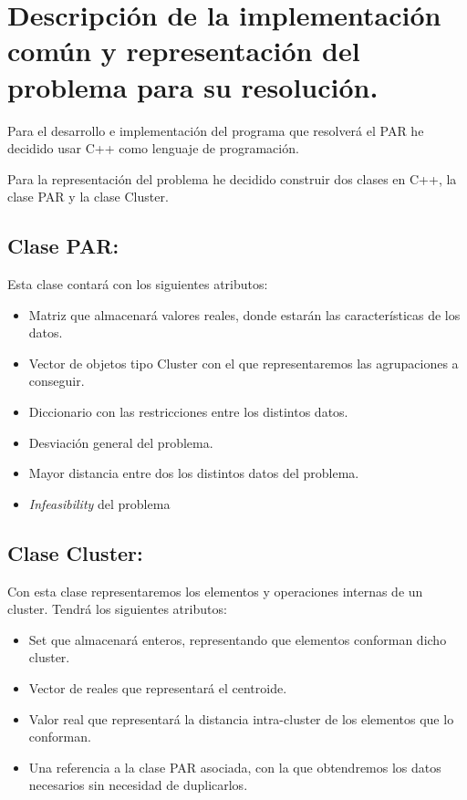 \documentclass[12pt, spanish]{article}
\begin{document}
\newpage

\section{Descripción de la implementación común y representación del problema para su resolución.}

Para el desarrollo e implementación del programa que resolverá el PAR he decidido usar C++ como lenguaje de programación.

Para la representación del problema he decidido construir dos clases en C++, la clase PAR y la clase Cluster.



\subsection{Clase PAR:}


Esta clase contará con los siguientes atributos:

\begin{itemize}
	\item {Matriz que almacenará valores reales, donde estarán las características de los datos.}
	\item {Vector de objetos tipo Cluster con el que representaremos las agrupaciones a conseguir.}
	\item {Diccionario con las restricciones entre los distintos datos.}
	\item {Desviación general del problema.}
	\item {Mayor distancia entre dos los distintos datos del problema.}
	\item {\textit{Infeasibility} del problema}
\end{itemize}


\subsection{Clase Cluster:}

Con esta clase representaremos los elementos y operaciones internas de un cluster. Tendrá los siguientes atributos:

\begin{itemize}
	\item {Set que almacenará enteros, representando que elementos conforman dicho cluster.}
	\item {Vector de reales que representará el centroide.}
	\item {Valor real que representará la distancia intra-cluster de los elementos que lo conforman.}
	\item {Una referencia a la clase PAR asociada, con la que obtendremos los datos necesarios sin necesidad de duplicarlos.}
\end{itemize}
\end{document}
